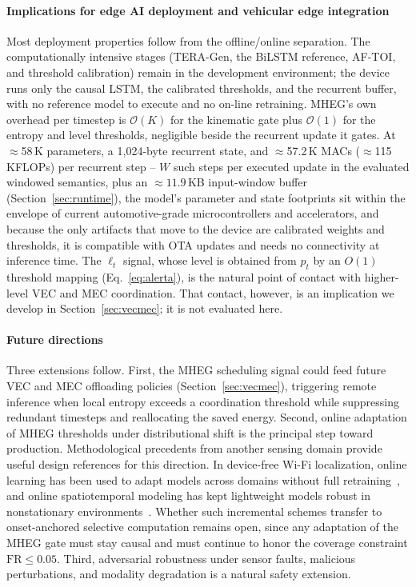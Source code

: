 \documentclass[a4paper,fleqn]{cas-dc}
\newcommand{\TERAGen}{\mbox{TERA-Gen}\xspace}
\newcommand{\AFTOI}{\mbox{AF-TOI}\xspace}
\newcommand{\MHEG}{\mbox{MHEG}\xspace}
\begin{document}
\paragraph{Implications for edge AI deployment and vehicular edge integration}
Most deployment properties follow from the offline/online separation. The computationally intensive stages (\TERAGen, the BiLSTM reference, \AFTOI, and threshold calibration) remain in the development environment; the device runs only the causal LSTM, the
calibrated thresholds, and the recurrent buffer, with no reference model to execute
and no on-line retraining. {\color{\revcolor}\MHEG's own overhead per timestep is
$\mathcal{O}(K)$ for the kinematic gate plus $\mathcal{O}(1)$ for the entropy
and level thresholds, negligible beside the recurrent update it gates.} At $\approx$58\,K parameters, a 1,024-byte
recurrent state, and {\color{\revcolor}$\approx$57.2\,K MACs
($\approx$115\,KFLOPs) per recurrent step -- $W$ such steps per executed
update in the evaluated windowed semantics, plus an ${\approx}11.9$\,KB
input-window buffer (Section~\ref{sec:runtime})}, the model's parameter and
state footprints sit within the envelope of current automotive-grade
microcontrollers and accelerators, and because
the only artifacts that move to the device are calibrated weights and thresholds, it
is compatible with OTA updates and needs no connectivity at inference time. The
$\ell_t$ signal{\color{\revcolor}, whose level is obtained from $p_t$ by an $O(1)$
threshold mapping (Eq.~\ref{eq:alerta}),} is the natural point of contact with
higher-level VEC and MEC coordination. That contact, however, is an implication
we develop in Section~\ref{sec:vecmec}; it is not evaluated here.
\paragraph{Future directions}
Three extensions follow. First, the \MHEG scheduling signal could feed future VEC
and MEC offloading policies (Section~\ref{sec:vecmec}), triggering remote
inference when local entropy exceeds a coordination threshold while suppressing
redundant timesteps and reallocating the saved energy. Second, online adaptation
of \MHEG thresholds under distributional shift is the principal step toward
production. {\color{\revcolor}Methodological precedents from another sensing
domain provide useful design references for this direction. In device-free \mbox{Wi-Fi}
localization, online learning has been used to adapt models across domains
without full retraining~\cite{zhang2025leveraging}, and online spatiotemporal
modeling has kept lightweight models robust in nonstationary
environments~\cite{zhang2023spatiotemporal}. Whether such incremental schemes
transfer to onset-anchored selective computation remains open, since any
adaptation of the \MHEG gate must stay causal and must continue to honor the
coverage constraint $\mathrm{FR}\le0.05$.} Third, adversarial robustness under sensor faults, malicious
perturbations, and modality degradation is a natural safety extension.
\end{document}
